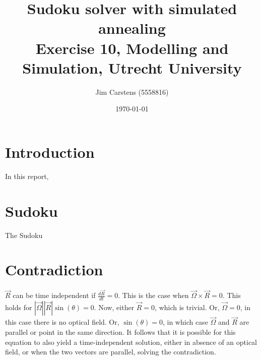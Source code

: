 \documentclass[a4paper]{article}
\title{\textbf{Sudoku solver with simulated annealing} \\\large{Exercise 10, Modelling and Simulation, Utrecht University}}
\author{Jim Carstens (5558816)}
\date{\today}
\begin{document}
\maketitle
\hrulefill
\tableofcontents
\hrulefill
\section*{Introduction}
In this report, 

\section{Sudoku}  \label{sec:c}
The Sudoku

\section{Contradiction}
$\vec{R}$ can be time independent if $\frac{d\vec{R}}{dt}=0$. This is the case when $\vec{\Omega} \times \vec{R}=0$. This holds for $|\vec{\Omega}||\vec{R}|\sin(\theta)=0$. Now, either $\vec{R}=0$, which is trivial. Or, $\vec{\Omega}=0$, in this case there is no optical field. Or, $\sin(\theta)=0$, in which case $\vec{\Omega}$ and $\vec{R}$ are parallel or point in the same direction.
It follows that it is possible for this equation to also yield a time-independent solution, either in absence of an optical field, or when the two vectors are parallel, solving the contradiction.







\end{document}
